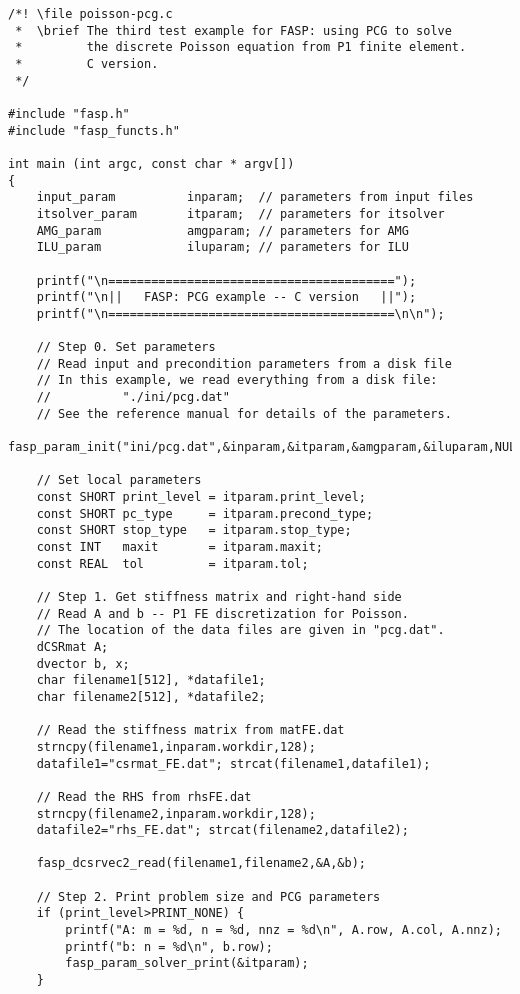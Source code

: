 \documentclass[11pt]{memoir}
\begin{document}
\begin{lstlisting}[stepnumber=1,firstnumber=1]
/*! \file poisson-pcg.c
 *  \brief The third test example for FASP: using PCG to solve
 *         the discrete Poisson equation from P1 finite element.
 *         C version.
 */

#include "fasp.h"
#include "fasp_functs.h"

int main (int argc, const char * argv[])
{
    input_param          inparam;  // parameters from input files
    itsolver_param       itparam;  // parameters for itsolver
    AMG_param            amgparam; // parameters for AMG
    ILU_param            iluparam; // parameters for ILU

    printf("\n========================================");
    printf("\n||   FASP: PCG example -- C version   ||");
    printf("\n========================================\n\n");

    // Step 0. Set parameters
    // Read input and precondition parameters from a disk file
    // In this example, we read everything from a disk file:
    //          "./ini/pcg.dat"
    // See the reference manual for details of the parameters.
    fasp_param_init("ini/pcg.dat",&inparam,&itparam,&amgparam,&iluparam,NULL);

    // Set local parameters
    const SHORT print_level = itparam.print_level;
    const SHORT pc_type     = itparam.precond_type;
    const SHORT stop_type   = itparam.stop_type;
    const INT   maxit       = itparam.maxit;
    const REAL  tol         = itparam.tol;

    // Step 1. Get stiffness matrix and right-hand side
    // Read A and b -- P1 FE discretization for Poisson.
    // The location of the data files are given in "pcg.dat".
    dCSRmat A;
    dvector b, x;
    char filename1[512], *datafile1;
    char filename2[512], *datafile2;

    // Read the stiffness matrix from matFE.dat
    strncpy(filename1,inparam.workdir,128);
    datafile1="csrmat_FE.dat"; strcat(filename1,datafile1);

    // Read the RHS from rhsFE.dat
    strncpy(filename2,inparam.workdir,128);
    datafile2="rhs_FE.dat"; strcat(filename2,datafile2);

    fasp_dcsrvec2_read(filename1,filename2,&A,&b);

    // Step 2. Print problem size and PCG parameters
    if (print_level>PRINT_NONE) {
        printf("A: m = %d, n = %d, nnz = %d\n", A.row, A.col, A.nnz);
        printf("b: n = %d\n", b.row);
        fasp_param_solver_print(&itparam);
    }


\end{lstlisting}
\end{document}
